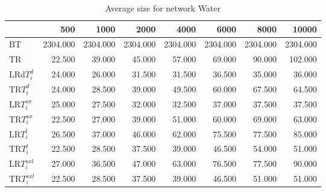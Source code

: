 \begin{table}
\begin{center}
\begin{tabular}{lrrrrrrr}
 & 500 &  1000 & 2000 & 4000 & 6000& 8000&  10000\\\hline
BT & 2304.000 & 2304.000 & 2304.000 & 2304.000 & 2304.000 & 2304.000 & 2304.000\\\hline
TR & 22.500 & 39.000 & 45.000 & 57.000 & 69.000 & 90.000 & 102.000\\\hline
LRd$T_i^d$ & 24.000 & 26.000 & 31.500 & 31.500 & 36.500 & 35.000 & 36.000\\\hline
TR$T_i^d$ & 24.000 & 28.500 & 39.000 & 49.500 & 60.000 & 67.500 & 64.500\\\hline
LR$T_i^{sx}$ & 25.000 & 27.500 & 32.000 & 32.500 & 37.000 & 37.500 & 37.500\\\hline
TR$T_i^{sx}$ & 22.500 & 27.000 & 39.000 & 51.000 & 60.000 & 69.000 & 63.000\\\hline
LR$T_i^l$ & 26.500 & 37.000 & 46.000 & 62.000 & 75.500 & 77.500 & 85.000\\\hline
TR$T_i^l$ & 22.500 & 28.500 & 37.500 & 39.000 & 46.500 & 54.000 & 51.000\\\hline
LR$T_i^{sxl}$ & 27.000 & 36.500 & 47.000 & 63.000 & 76.500 & 77.500 & 90.000\\\hline
TR$T_i^{sxl}$ & 22.500 & 28.500 & 37.500 & 39.000 & 46.500 & 51.000 & 51.000\\\hline
\end{tabular}
\end{center}
\caption{Average size for network Water }
\label{Watersi}
\end{table}

